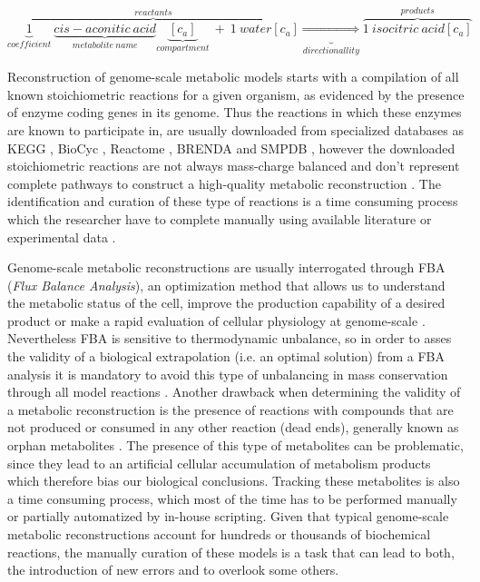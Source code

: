 \begin{equation}
\label{sr}
\overbrace{\underbrace{1}_{coefficient}\ \underbrace{cis-aconitic\ acid}_{metabolite\ name}\underbrace{[c_a]}_{compartment}\ +\ 1\ water[c_a]}^{reactants} \underbrace{\Rightarrow}_{directionallity} \overbrace{1\ isocitric\ acid[c_a]}^{products}
\end{equation}

Reconstruction of genome-scale metabolic models starts with a compilation of all known stoichiometric reactions for a given organism, as evidenced by the presence of enzyme coding genes in its genome. Thus the reactions in which these enzymes are known to  participate in, are usually downloaded from specialized databases as KEGG \citep{Kanehisa2000}, BioCyc \citep{Caspi2014}, Reactome \citep{Croft2014}, BRENDA \citep{Chang2015} and SMPDB \citep{Jewison2014}, however the downloaded stoichiometric reactions are not always mass-charge balanced and don't represent complete pathways to construct a high-quality metabolic reconstruction \citep{Thiele2010, Gevorgyan2008}. The identification and curation of these type of reactions is a time consuming process which  the researcher have to complete manually using available literature or experimental data \citep{Lakshmanan2014}.

Genome-scale metabolic reconstructions are usually interrogated through FBA (\emph{Flux Balance Analysis}), an optimization method that allows us to understand the metabolic status of the cell, improve the production capability of a desired product or make a rapid evaluation of cellular physiology at genome-scale \citep{Kim2008,Park2009}. Nevertheless FBA is sensitive to thermodynamic unbalance, so in order to asses the validity of a biological extrapolation (i.e. an optimal solution) from a FBA analysis it is mandatory to avoid this type of unbalancing in mass conservation through all model reactions \citep{Reznik2013}. Another drawback when determining  the validity of a metabolic reconstruction is the presence of  reactions with compounds that are not produced or consumed in any other reaction (dead ends), generally known as orphan metabolites  \citep{Park2009, Thiele2010}. The presence of this type of metabolites can be problematic, since they lead to an artificial cellular  accumulation of  metabolism products which therefore  bias our biological conclusions. Tracking these metabolites is also a time consuming process, which most of the time has to be performed manually or partially automatized by in-house scripting. Given that typical genome-scale metabolic reconstructions account for hundreds or thousands of biochemical reactions, the manually curation of these models is a task that can lead to both, the introduction of new errors and to overlook some others.

